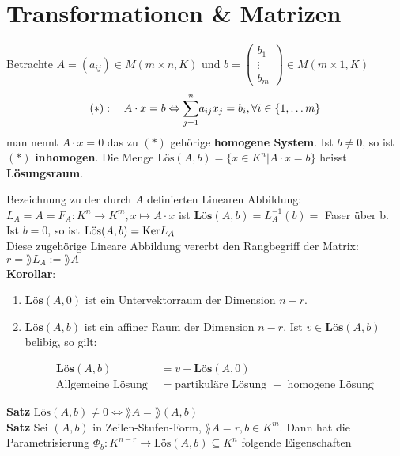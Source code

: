 \newpage
\section{Transformationen \& Matrizen}
\begin{mdframed}
Betrachte $A = (a_{ij}) \in M(m\times n,K)$ und $b = \begin{pmatrix}
b_{1} \\ \vdots \\	 b_{m}
\end{pmatrix} \in M(m\times 1,K)$
\begin{align*}
    (*): \quad A\cdot x = b \Leftrightarrow \underset{j = 1}{\overset{n}{\sum}} a_{ij}x_j = b_i, \forall i \in \{1, \ldots m\}
\end{align*}
man nennt $A \cdot x = 0$ das zu $(*)$ gehörige \textbf{homogene System}. Ist $b \neq 0$, so ist $(*)$ \textbf{inhomogen}.\quad 
Die Menge $\text{Lös}(A,b) = \{x \in K^n \big\vert A \cdot x  = b\}$ heisst \textbf{Lösungsraum}.
\end{mdframed}
Bezeichnung zu der durch $A$ definierten Linearen Abbildung: $L_A = A = F_A : K^n \rightarrow K^m, x \mapsto A\cdot x$ ist $\textbf{Lös}(A,b) = L_A^{-1}(b) =$ Faser über b. Ist $b = 0$, so ist $\text{Lös}(A,b) = \text{Ker} L_A$\\
Diese zugehörige Lineare Abbildung vererbt den Rangbegriff der Matrix: $r = \rang L_A := \rang A$\\
\textbf{Korollar}: 
\begin{enumerate}[{(}1{.)}]
    \item	$\textbf{Lös}(A,0)$ ist ein Untervektorraum der Dimension $n-r$.
    
    \item $\textbf{Lös}(A,b)$ ist ein affiner Raum der Dimension $n-r$. Ist $v \in \textbf{Lös}(A,b)$ belibig, so gilt:
    \begin{mdframed}
        \begin{align*}
            \textbf{Lös}(A,b) &= v + \textbf{Lös}(A,0)\\
            \text{Allgemeine Lösung } &= \text{partikuläre Lösung } + \text{ homogene Lösung}
        \end{align*}
    \end{mdframed}    
\end{enumerate}
\textbf{Satz} $\text{Lös}(A,b) \neq 0 \Leftrightarrow \rang A = \rang (A,b)$\\
\textbf{Satz} Sei $(A,b)$ in Zeilen-Stufen-Form, $\rang A = r, b \in K^m$. Dann hat die Parametrisierung $\Phi_b: K^{n-r} \rightarrow \text{Lös}(A,b) \subseteq K^n$ folgende Eigenschaften
